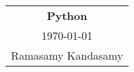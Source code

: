 



\raggedright
\footnotesize
\begin{multicols*}{3}
\setlength{\premulticols}{1pt}
\setlength{\postmulticols}{1pt}
\setlength{\multicolsep}{1pt}
\setlength{\columnsep}{2pt}

\begin{center}
\begin{tabular}{c}
\LARGE{\textbf{Python}}\\
\today\\
Ramasamy Kandasamy\\
\end{tabular}
\end{center}




\end{multicols*}
